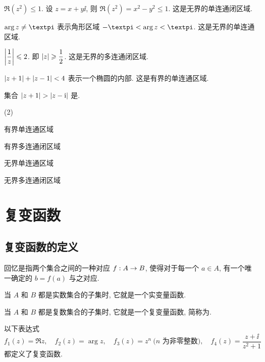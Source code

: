 \begin{exampleenum}
  \item $\Re(z^2)\le1$. 设 $z=x+y\ii$, 则 $\Re(z^2)=x^2-y^2\le1$. 这是无界的单连通闭区域.
  \item $\arg z\neq \cpi$ 表示角形区域 $-\cpi<\arg z<\cpi$. 这是无界的单连通区域.
  \smallskip
  \item $\biggl\vert\dfrac1z\biggr\vert\leqslant2$. 即 $\lvert z\rvert\geqslant\dfrac12$. 这是无界的多连通闭区域.
  \smallskip
  \item $\lvert z+1\rvert+\lvert z-1\rvert<4$ 表示一个椭圆的内部. 这是有界的单连通区域.
\end{exampleenum}

\begin{exercise}
  集合 $\lvert z+1\rvert>\lvert z-\mathrm{i}\rvert$ 是\fillbrace{}.
  \begin{examplechoice}(2)
    \item 有界单连通区域
    \item 有界多连通闭区域
    \item 无界单连通区域
    \item 无界多连通闭区域
  \end{examplechoice}
\end{exercise}



\section{复变函数}

\subsection{复变函数的定义}

回忆是指两个集合之间的一种对应 $f:A\rightarrow B$, 使得对于每一个 $a\in A$, 有一个唯一确定的 $b=f(a)$ 与之对应.
\begin{enuma}
  \item 当 $A$ 和 $B$ 都是实数集合的子集时, 它就是一个实变量函数.
  \item 当 $A$ 和 $B$ 都是复数集合的子集时, 它就是一个复变量函数, 简称为.
\end{enuma}

\begin{example}
  以下表达式
  \[
    f_1(z)=\Re z,\quad
    f_2(z)=\arg z,\quad
    f_3(z)=z^n \ \text{($n$ 为非零整数)},\quad
    f_4(z)=\frac{z+\ii}{z^2+1}
  \]
  都定义了复变函数.
\end{example}

